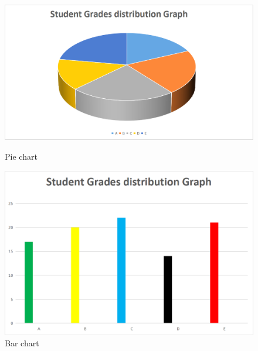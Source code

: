 \begin{figure}[h]
	\centering
	\begin{minipage}{0.49\linewidth}
		\includegraphics[width=0.9\linewidth]{img/pie_chart}
		\caption{Pie chart}
		\label{fig:piechart}
	\end{minipage}
	\begin{minipage}{0.49\linewidth}
		\includegraphics[width=0.9\linewidth]{img/bar_chart}
		\caption{Bar chart}
		\label{fig:piechart}
	\end{minipage}
\end{figure}







